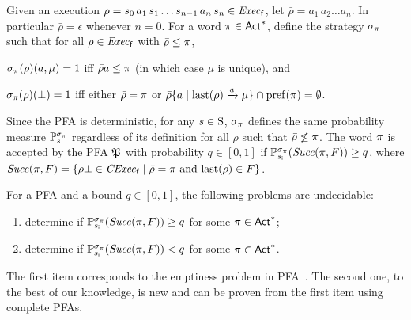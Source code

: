 Given an execution
$\rho = s_0\,a_1\,s_1\ldots s_{n-1}\,a_n\,s_n \in \execf$,
let $\bar{\rho} = a_1\, a_2\ldots a_n$.  In particular
$\bar{\rho} = \epsilon$ whenever $n=0$.
%
For a word $\plan\in\Act^*$, define the strategy $\strat_\plan$ such
that for all $\rho\in\execf$ with $\bar{\rho}\leq\plan$,
%
\begin{enumerate*}[(i)]
\item%
  $\strat_\plan(\rho)(a,\mu)=1$ iff $\bar{\rho}a\leq\plan$ (in which
  case $\mu$ is unique), and
\item%
  $\strat_\plan(\rho)(\complete)=1$ iff either $\bar{\rho}=\plan$ or
  $\bar{\rho}\{a\mid{\last(\rho)\reach{a}\mu}\}\cap\pref(\plan) = \emptyset$.
\end{enumerate*}
%
Since the PFA is deterministic, for any $s\in\S$, $\strat_\plan$
defines the same probability measure $\Prob_s^{\strat_\plan}$
regardless of its definition for all $\rho$ such that
$\bar{\rho}\not\leq\plan$.  
%
The word $\plan$ is accepted by the PFA $\pfa$ with probability
$q\in[0,1]$ if $\Prob_{\sini}^{\strat_\plan}(\Succ(\plan,F))\geq q$, where
$\Succ(\plan,F)=\{{\rho\complete\in\cexecf}\mid{\bar{\rho}=\plan \text{ and } \last(\rho)\in F}\}$.
%

\begin{proposition}\label{prop:PFA:undecidabilty}
  For a PFA and a bound $q\in[0,1]$, the following problems are undecidable:
  \begin{enumerate}
  \item\label{prop:PFA:undecidabilty:high}%
    determine if $\Prob_{\sini}^{\strat_\plan}(\Succ(\plan,F)) \geq q$
    for some $\plan\in\Act^*$;
  \item\label{prop:PFA:undecidabilty:low}%
    determine if $\Prob_{\sini}^{\strat_\plan}(\Succ(\plan,F)) < q$
    for some $\plan\in\Act^*$.
  \end{enumerate}
\end{proposition}

The first item corresponds to the emptiness problem in
PFA~\cite{Paz71,MadaniHC99}.
%
The second one,  to the best of our knowledge,  is new and can be
proven from the first item using complete PFAs.
%
%


